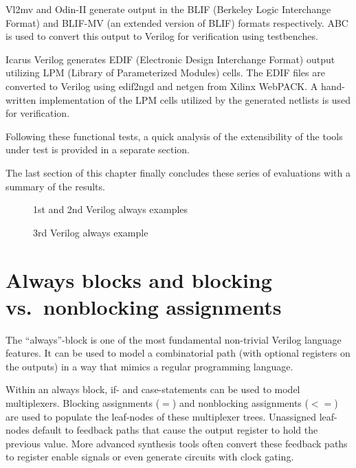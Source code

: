 Vl2mv and Odin-II generate output in the BLIF (Berkeley Logic Interchange
Format) and BLIF-MV (an extended version of BLIF) formats respectively.
ABC  is used to convert this output to Verilog for verification
using testbenches.

Icarus Verilog generates EDIF (Electronic Design Interchange Format) output
utilizing LPM (Library of Parameterized Modules) cells. The EDIF files are
converted to Verilog using edif2ngd and netgen from Xilinx WebPACK. A
hand-written implementation of the LPM cells utilized by the generated netlists
is used for verification.

Following these functional tests, a quick analysis of the extensibility of the tools
under test is provided in a separate section.

The last section of this chapter finally concludes these series of evaluations
with a summary of the results.

\begin{figure}[t!]
	\begin{minipage}{7.7cm}
		
	\end{minipage}
	\hfill
	\begin{minipage}{7.7cm}
		
	\end{minipage}
	\caption{1st and 2nd Verilog always examples}
	\label{fig:StateOfTheArt_always12}
\end{figure}

\begin{figure}[!]
	
	\caption{3rd Verilog always example}
	\label{fig:StateOfTheArt_always3}
\end{figure}

\section{Always blocks and blocking vs.~nonblocking assignments}
\label{sec:blocking_nonblocking}

The ``always''-block is one of the most fundamental non-trivial Verilog
language features.  It can be used to model a combinatorial path (with optional
registers on the outputs) in a way that mimics a regular programming language.

Within an always block, if- and case-statements can be used to model multiplexers.
Blocking assignments ($=$) and nonblocking assignments ($<=$) are used to populate the
leaf-nodes of these multiplexer trees. Unassigned leaf-nodes default to feedback
paths that cause the output register to hold the previous value. More advanced
synthesis tools often convert these feedback paths to register enable signals or
even generate circuits with clock gating.


